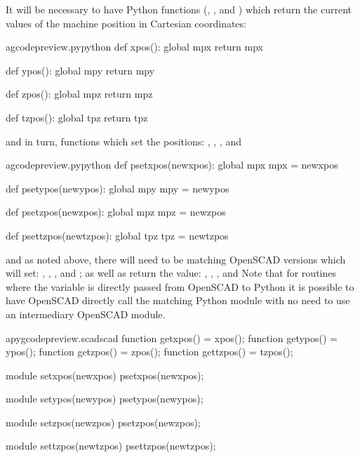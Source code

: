 \documentclass{ltxdoc}
\begin{document}
It will be necessary to have Python functions (, , 
and ) which return the current values of the machine position in 
Cartesian coordinates: 

\lstset{firstnumber=\thegcpy}
\begin{writecode}{a}{gcodepreview.py}{python}
def xpos():
    global mpx
    return mpx

def ypos():
    global mpy
    return mpy

def zpos():
    global mpz
    return mpz

def tzpos():
    global tpz
    return tpz

\end{writecode}
\addtocounter{gcpy}{16}

\noindent and in turn, functions which set the positions: 
,
,
, and

\lstset{firstnumber=\thegcpy}
\begin{writecode}{a}{gcodepreview.py}{python}
def psetxpos(newxpos):
    global mpx
    mpx = newxpos

def psetypos(newypos):
    global mpy
    mpy = newypos

def psetzpos(newzpos):
    global mpz
    mpz = newzpos
 
def psettzpos(newtzpos):
    global tpz
    tpz = newtzpos

\end{writecode}
\addtocounter{gcpy}{16}
 
\noindent and as noted above, there will need to be matching OpenSCAD versions which will 
set: , , , and
; as well as return the value: , , , and  
Note that for routines where the variable is directly passed from OpenSCAD to Python
it is possible to have OpenSCAD directly call the matching Python module with no need
to use an intermediary OpenSCAD module.
 
\lstset{firstnumber=\thepyscad}
\begin{writecode}{a}{pygcodepreview.scad}{scad}
function getxpos() = xpos();
function getypos() = ypos();
function getzpos() = zpos();
function gettzpos() = tzpos();

module setxpos(newxpos) {
    psetxpos(newxpos);
}

module setypos(newypos) {
    psetypos(newypos);
}

module setzpos(newzpos) {
    psetzpos(newzpos);
}

module settzpos(newtzpos) {
    psettzpos(newtzpos);
}

\end{writecode}
\addtocounter{pyscad}{21}
 
\end{document}
